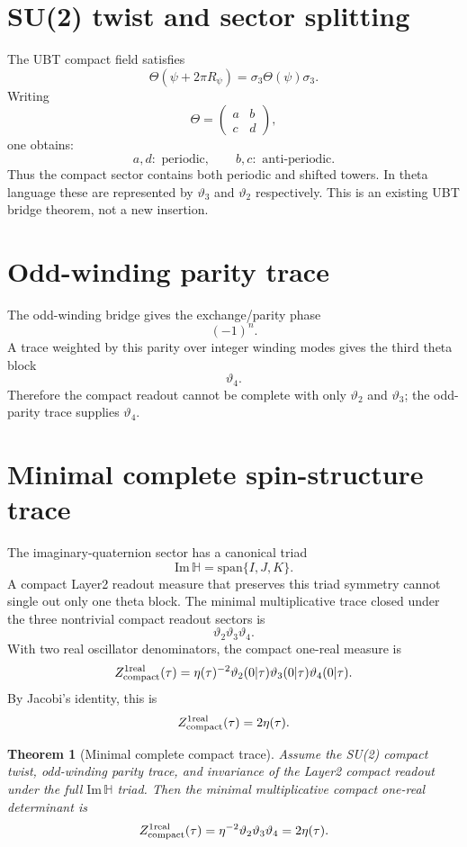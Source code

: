 \documentclass[12pt,a4paper]{article}
\newtheorem{theorem}[definition]{Theorem}
\begin{document}
\section{SU(2) twist and sector splitting}

The UBT compact field satisfies
\[
  \Theta(\psi+2\pi R_\psi)=\sigma_3\Theta(\psi)\sigma_3.
\]
Writing
\[
  \Theta=\begin{pmatrix}a&b\\c&d\end{pmatrix},
\]
one obtains:
\[
  a,d:\text{ periodic},
  \qquad
  b,c:\text{ anti-periodic}.
\]
Thus the compact sector contains both periodic and shifted towers.  In theta
language these are represented by $\vartheta_3$ and $\vartheta_2$ respectively.
This is an existing UBT bridge theorem, not a new insertion.

\section{Odd-winding parity trace}

The odd-winding bridge gives the exchange/parity phase
\[
  (-1)^n.
\]
A trace weighted by this parity over integer winding modes gives the third theta
block
\[
  \vartheta_4.
\]
Therefore the compact readout cannot be complete with only $\vartheta_2$ and
$\vartheta_3$; the odd-parity trace supplies $\vartheta_4$.

\section{Minimal complete spin-structure trace}

The imaginary-quaternion sector has a canonical triad
\[
  \mathrm{Im}\,\mathbb H=\mathrm{span}\{I,J,K\}.
\]
A compact Layer2 readout measure that preserves this triad symmetry cannot
single out only one theta block.  The minimal multiplicative trace closed under
the three nontrivial compact readout sectors is
\[
  \vartheta_2\vartheta_3\vartheta_4.
\]
With two real oscillator denominators, the compact one-real measure is
\[
  Z_{\rm compact}^{1\rm real}(\tau)
  =\eta(\tau)^{-2}\vartheta_2(0|\tau)\vartheta_3(0|\tau)\vartheta_4(0|\tau).
\]
By Jacobi's identity, this is
\[
  Z_{\rm compact}^{1\rm real}(\tau)=2\eta(\tau).
\]

\begin{theorem}[Minimal complete compact trace]
Assume the SU(2) compact twist, odd-winding parity trace, and invariance of the
Layer2 compact readout under the full $\mathrm{Im}\,\mathbb H$ triad.  Then the
minimal multiplicative compact one-real determinant is
\[
  Z_{\rm compact}^{1\rm real}(\tau)
  =\eta^{-2}\vartheta_2\vartheta_3\vartheta_4=2\eta(\tau).
\]
\end{theorem}
\end{document}
